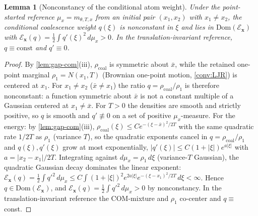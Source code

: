 \documentclass[reqno,final,11pt]{amsart}
\theoremstyle{plain}
\newtheorem{lemma}[theorem]{Lemma}
\theoremstyle{definition}
\theoremstyle{remark}
\newcommand{\Dom}{\mathrm{Dom}}
\newcommand{\cE}{\mathcal E}
\begin{document}
\begin{lemma}[Nonconstancy of the conditional atom weight]\label{lem:q-nonconstant}
Under the point-started reference $\mu_x=m_{\theta,T,x}$ from an initial pair
$(x_1,x_2)$ with $x_1\neq x_2$, the conditional coalescence weight $q(\xi)$ is
nonconstant in $\xi$ and lies in $\Dom(\cE_{\mathbf x})$ with
$\cE_{\mathbf x}(q)=\tfrac12\int q'(\xi)^2\,d\mu_x>0$. In the translation-invariant
reference, $q\equiv\mathrm{const}$ and $q'\equiv0$.
\end{lemma}
\begin{proof}
By \cref{lem:gap-com}(iii), $\rho_{\mathrm{coal}}$ is symmetric about $\bar x$, while the
retained one-point marginal $\rho_1=N(x_1,T)$ (Brownian one-point motion, \cref{conv:LJR})
is centered at $x_1$. For $x_1\neq x_2$ ($\bar x\neq x_1$) the ratio
$q=\rho_{\mathrm{coal}}/\rho_1$ is therefore nonconstant: a function symmetric about
$\bar x$ is not a constant multiple of a Gaussian centered at $x_1\neq\bar x$. For $T>0$
the densities are smooth and strictly positive, so $q$ is smooth and $q'\not\equiv0$ on a
set of positive $\mu_x$-measure.
For the energy: by \cref{lem:gap-com}(iii), $\rho_{\mathrm{coal}}(\xi)\le
C e^{-(\xi-\bar x)^2/2T}$ with the same quadratic rate $1/2T$ as $\rho_1$ (variance $T$),
so the quadratic exponents cancel in $q=\rho_{\mathrm{coal}}/\rho_1$ and $q(\xi),q'(\xi)$
grow at most exponentially, $|q'(\xi)|\le C(1+|\xi|)e^{a|\xi|}$ with $a=|x_2-x_1|/2T$.
Integrating against $d\mu_x=\rho_1\,d\xi$ (variance-$T$ Gaussian), the quadratic Gaussian
decay dominates the linear exponent:
$\cE_{\mathbf x}(q)=\tfrac12\int q'^2\,d\mu_x\le C\int (1+|\xi|)^2 e^{2a|\xi|}
e^{-(\xi-x_1)^2/2T}\,d\xi<\infty$. Hence $q\in\Dom(\cE_{\mathbf x})$, and
$\cE_{\mathbf x}(q)=\tfrac12\int q'^2\,d\mu_x>0$ by nonconstancy. In the
translation-invariant reference the COM-mixture and $\rho_1$ co-center and $q\equiv$const.
\end{proof}
\end{document}

